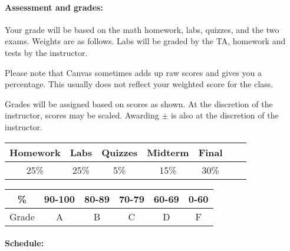 \documentclass{article}
\begin{document}
\paragraph{Assessment and grades:}

Your grade will be based on the math homework, labs, quizzes, and the two
exams. Weights are as follows.  Labs will be graded by the TA, homework
and tests by the instructor.

Please note that Canvas sometimes adds
up raw scores and gives you a percentage.  This usually does not
reflect your weighted score for the class.

Grades will be assigned based on scores as shown.  At the discretion
of the instructor, scores may be scaled.  Awarding $\pm$ is also at
the discretion of the instructor.

\begin{tabular}{|c|c|c|c|c|c|c|}\hline
Homework & Labs & Quizzes & Midterm & Final\\\hline
25\% & 25\% & 5\% & 15\% & 30\% \\\hline
\end{tabular}\hfill
\begin{tabular}{|c|c|c|c|c|c|}\hline
\% & 90-100 & 80-89 & 70-79 & 60-69 & 0-60\\\hline
Grade & A & B & C & D & F\\\hline
\end{tabular}


  
\paragraph{Schedule:}
\end{document}
